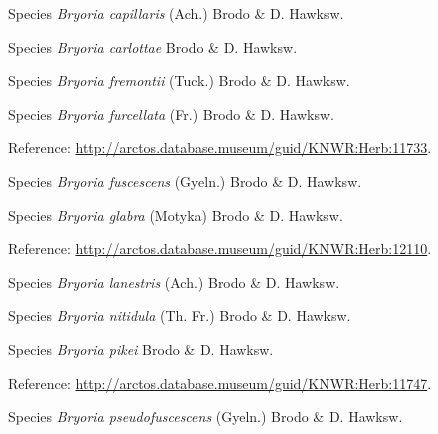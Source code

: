\documentclass[9pt, article]{memoir}
\begin{document}
\begin{multicols}{2}
\vspace{6pt}\noindent\hspace{36pt}Species \textit{Bryoria capillaris} (Ach.) Brodo \& D. Hawksw.


\vspace{6pt}\noindent\hspace{36pt}Species \textit{Bryoria carlottae} Brodo \& D. Hawksw.


\vspace{6pt}\noindent\hspace{36pt}Species \textit{Bryoria fremontii} (Tuck.) Brodo \& D. Hawksw.


\vspace{6pt}\noindent\hspace{36pt}Species \textit{Bryoria furcellata} (Fr.) Brodo \& D. Hawksw.


\vspace{6pt}Reference: 
\url{http://arctos.database.museum/guid/KNWR:Herb:11733}.

\vspace{6pt}\noindent\hspace{36pt}Species \textit{Bryoria fuscescens} (Gyeln.) Brodo \& D. Hawksw.


\vspace{6pt}\noindent\hspace{36pt}Species \textit{Bryoria glabra} (Motyka) Brodo \& D. Hawksw.


\vspace{6pt}Reference: 
\url{http://arctos.database.museum/guid/KNWR:Herb:12110}.

\vspace{6pt}\noindent\hspace{36pt}Species \textit{Bryoria lanestris} (Ach.) Brodo \& D. Hawksw.


\vspace{6pt}\noindent\hspace{36pt}Species \textit{Bryoria nitidula} (Th. Fr.) Brodo \& D. Hawksw.


\vspace{6pt}\noindent\hspace{36pt}Species \textit{Bryoria pikei} Brodo \& D. Hawksw.


\vspace{6pt}Reference: 
\url{http://arctos.database.museum/guid/KNWR:Herb:11747}.

\vspace{6pt}\noindent\hspace{36pt}Species \textit{Bryoria pseudofuscescens} (Gyeln.) Brodo \& D. Hawksw.



\end{multicols}
\end{document}
